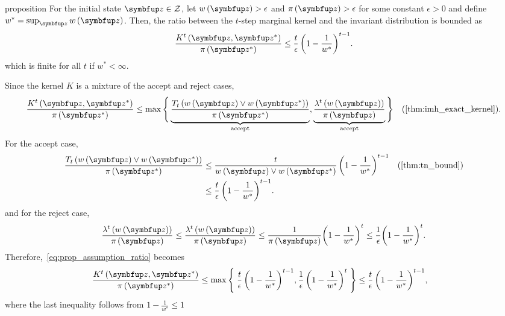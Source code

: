
\begin{theoremEnd}{proposition}\label{thm:imh_tail}
  For the initial state \(\vz \in \mathcal{Z}\), let \(w\left(\vz\right) > \epsilon\) and \(\pi\left(\vz\right) > \epsilon\) for some constant \(\epsilon > 0\) and define \(w^* = \sup_{\vz} w\left(\vz\right)\).
  Then, the ratio between the \(t\)-step marginal kernel and the invariant distribution is bounded as
  {\small
  \[
  \frac{K^t\left(\vz, \vz^*\right)}{\pi\left(\vz^*\right)} \leq
  \frac{t}{\epsilon} \, {\left(1 - \frac{1}{w^*}\right)}^{t-1}.
  \]
  }
  which is finite for all \(t\) if \(w^* < \infty\).
\end{theoremEnd}
\begin{proofEnd}
  Since the kernel \(K\) is a mixture of the accept and reject cases, 
  \begin{align}
    \frac{K^t\left(\vz, \vz^*\right)}{\pi\left(\vz^*\right)}
    &\leq
    \max\Bigg\{
    \underbrace{
      \frac{T_t\left(w\left(\vz\right) \vee w\left(\vz^*\right)\right)}{\pi\left(\vz^*\right)}
    }_{\text{accept}},
    \underbrace{
    \frac{\lambda^t\left(w\left(\vz\right)\right)}{\pi\left(\vz\right)}
    }_{\text{accept}}
    \Bigg\}
    &\text{(\cref{thm:imh_exact_kernel})}.\label{eq:prop_assumption_ratio}
  \end{align}
  For the accept case,
  \begin{align}
    \frac{T_t\left(w\left(\vz\right) \vee w\left(\vz^*\right)\right)}{\pi\left(\vz^*\right)}
    &\leq
    \frac{t}{w\left(\vz\right) \vee w\left(\vz^*\right)} \, {\left(1 - \frac{1}{w^*}\right)}^{t-1}
    &\text{(\cref{thm:tn_bound})}
    \\
    &\leq
    \frac{t}{\epsilon} \, {\left(1 - \frac{1}{w^*}\right)}^{t-1} .
  \end{align}
  and for the reject case,
  \begin{align}
    \frac{\lambda^t\left(w\left(\vz\right)\right)}{\pi\left(\vz\right)}
    \leq
    \frac{\lambda^t\left(w\left(\vz\right)\right)}{\pi\left(\vz\right)}
    \leq
    \frac{1}{\pi\left(\vz\right)} {\left(1 - \frac{1}{w^*}\right)}^{t}
    \leq
    \frac{1}{\epsilon}
    {\left(1 - \frac{1}{w^*}\right)}^{t}.
  \end{align}
  Therefore,~\cref{eq:prop_assumption_ratio} becomes
  \begin{align}
    \frac{K^t\left(\vz, \vz^*\right)}{\pi\left(\vz^*\right)}
    \leq
    \max\left\{\;
    \frac{t}{\epsilon} \, {\left(1 - \frac{1}{w^*}\right)}^{t-1},
    \frac{1}{\epsilon} \, {\left(1-\frac{1}{w^*}\right)}^t
    \;\right\}
    &\leq
    \frac{t}{\epsilon} \, {\left(1 - \frac{1}{w^*}\right)}^{t-1},
  \end{align}
  where the last inequality follows from \(1 - \frac{1}{w^*} \leq 1\)
\end{proofEnd}

